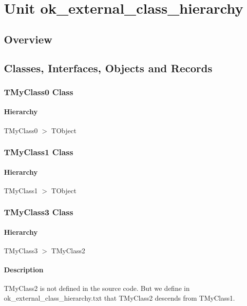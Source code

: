 \documentclass{report}
\begin{document}
\newlength{\tmplength}
\chapter{Unit ok{\_}external{\_}class{\_}hierarchy}
\section{Overview}
\begin{description}
\item[\texttt{\begin{ttfamily}TMyClass0\end{ttfamily} Class}]
\item[\texttt{\begin{ttfamily}TMyClass1\end{ttfamily} Class}]
\item[\texttt{\begin{ttfamily}TMyClass3\end{ttfamily} Class}]
\end{description}
\section{Classes, Interfaces, Objects and Records}
\subsection*{TMyClass0 Class}
\subsubsection*{\large{\textbf{Hierarchy}}\normalsize\hspace{1ex}\hfill}
TMyClass0 {$>$} TObject
\subsection*{TMyClass1 Class}
\subsubsection*{\large{\textbf{Hierarchy}}\normalsize\hspace{1ex}\hfill}
TMyClass1 {$>$} TObject
\subsection*{TMyClass3 Class}
\subsubsection*{\large{\textbf{Hierarchy}}\normalsize\hspace{1ex}\hfill}
TMyClass3 {$>$} TMyClass2
\subsubsection*{\large{\textbf{Description}}\normalsize\hspace{1ex}\hfill}
TMyClass2 is not defined in the source code. But we define in ok{\_}external{\_}class{\_}hierarchy.txt that TMyClass2 descends from TMyClass1.
\end{document}
